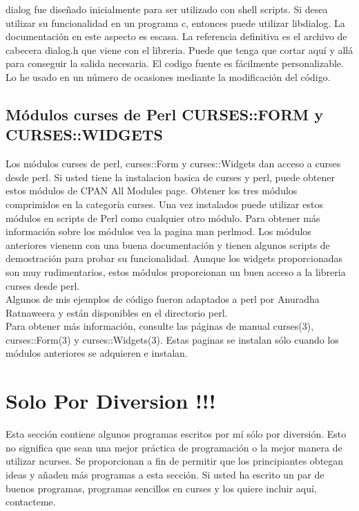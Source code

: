 \documentclass{article}
\begin{document}
dialog fue diseñado inicialmente para ser utilizado con shell scripts. Si desea
utilizar su funcionalidad en un programa c, entonces puede utilizar libdialog.
La documentación en este aspecto es escasa. La referencia definitiva es el
archivo de cabecera dialog.h que viene con el libreria. Puede que tenga que
cortar aquí y allá para conseguir la salida necesaria. El codigo fuente es
fácilmente personalizable. Lo he usado en un número de ocasiones mediante la
modificación del código.

\subsection{Módulos curses de Perl CURSES::FORM y CURSES::WIDGETS}%
Los módulos curses de perl, curses::Form y curses::Widgets dan acceso a curses
desde perl. Si usted tiene la instalacion basica de curses y perl, puede
obtener estos módulos de CPAN All Modules page. Obtener los tres módulos
comprimidos en la categoría curses. Una vez instalados puede utilizar estos
módulos en scripts de Perl como cualquier otro módulo. Para obtener más
información sobre los módulos vea la pagina man perlmod. Los módulos anteriores
vienenn con una buena documentación y tienen algunos scripts de demostración
para probar su funcionalidad. Aunque los widgets proporcionadas son muy
rudimentarios, estos módulos proporcionan un buen acceso a la libreria curses
desde perl.\\

Algunos de mis ejemplos de código fueron adaptados a perl por Anuradha
Ratnaweera y están disponibles en el directorio perl.\\

Para obtener más información, consulte las páginas de manual curses(3),
curses::Form(3) y curses::Widgets(3). Estas paginas se instalan sólo cuando los
módulos anteriores se adquieren e instalan.

\section{Solo Por Diversion !!!}%
Esta sección contiene algunos programas escritos por mí sólo por diversión.
Esto no significa que sean una mejor práctica de programación o la mejor manera
de utilizar ncurses. Se proporcionan a fin de permitir que los principiantes
obtegan ideas y añaden más programas a esta sección. Si usted ha escrito un par
de buenos programas, programas sencillos en curses y los quiere incluir aquí,
contacteme.
\end{document}
